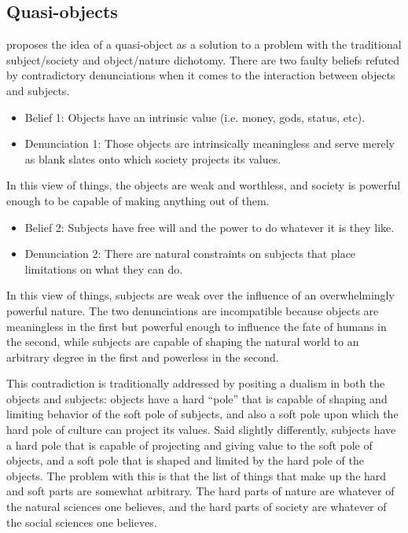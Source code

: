 \documentclass[a4paper]{article}
\begin{document}
\newpage
\begin{appendices}
\section{Quasi-objects}

\cite{latour2012we} proposes the idea of a quasi-object as a solution to a
problem with the traditional subject/society and object/nature dichotomy.
There are two faulty beliefs refuted by contradictory denunciations when it
comes to the interaction between objects and subjects.
%
\begin{itemize} \item[] Belief 1: Objects have an intrinsic value (i.e. money,
            gods, status, etc).

    \item[] Denunciation 1: Those objects are intrinsically meaningless and
        serve merely as blank slates onto which society projects its values.
\end{itemize}
%
In this view of things, the objects are weak and worthless, and society is
powerful enough to be capable of making anything out of them. 
%
\begin{itemize}
    \item[] Belief 2: Subjects have free will and the power to do whatever it
        is they like.

    \item[] Denunciation 2: There are natural constraints on subjects that
        place limitations on what they can do. 
\end{itemize}
%
In this view of things, subjects are weak over the influence of an
overwhelmingly powerful nature. The two denunciations are incompatible because
objects are meaningless in the first but powerful enough to influence the fate
of humans in the second, while subjects are capable of shaping the natural
world to an arbitrary degree in the first and powerless in the second.

This contradiction is traditionally addressed by positing a dualism in both
the objects and subjects: objects have a hard ``pole'' that is capable of
shaping and limiting behavior of the soft pole of subjects, and also a soft
pole upon which the hard pole of culture can project its values. Said slightly
differently, subjects have a hard pole that is capable of projecting and
giving value to the soft pole of objects, and a soft pole that is shaped and
limited by the hard pole of the objects. The problem with this is that the
list of things that make up the hard and soft parts are somewhat arbitrary.
The hard parts of nature are whatever of the natural sciences one believes,
and the hard parts of society are whatever of the social sciences one
believes.


\end{appendices}
\end{document}

